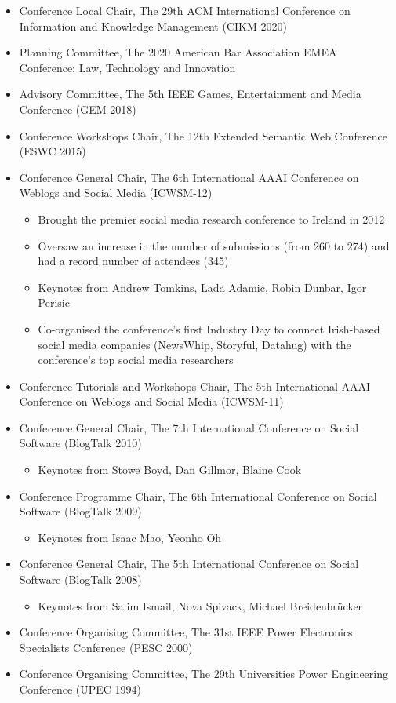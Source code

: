 \documentclass[10pt,a4paper]{res} %
\begin{document}
\begin{resume}
\begin{itemize} \itemsep -2pt
\item Conference Local Chair, The 29th ACM International Conference on Information and Knowledge Management (CIKM 2020)
\item Planning Committee, The 2020 American Bar Association EMEA Conference: Law, Technology and Innovation
\item Advisory Committee, The 5th IEEE Games, Entertainment and Media Conference (GEM 2018)
\item Conference Workshops Chair, The 12th Extended Semantic Web Conference (ESWC 2015)
\item Conference General Chair, The 6th International AAAI Conference on Weblogs and Social Media (ICWSM-12)
\begin{itemize} \itemsep -2pt
\item Brought the premier social media research conference to Ireland in 2012
\item Oversaw an increase in the number of submissions (from 260 to 274) and had a record number of attendees (345)
\item Keynotes from Andrew Tomkins, Lada Adamic, Robin Dunbar, Igor Perisic
\item Co-organised the conference's first Industry Day to connect Irish-based social media companies (NewsWhip, Storyful, Datahug) with the conference's top social media researchers
\end{itemize}
\item Conference Tutorials and Workshops Chair, The 5th International AAAI Conference on Weblogs and Social Media (ICWSM-11)
\item Conference General Chair, The 7th International Conference on Social Software (BlogTalk 2010)
\begin{itemize} \itemsep -2pt
\item Keynotes from Stowe Boyd, Dan Gillmor, Blaine Cook
\end{itemize}
\item Conference Programme Chair, The 6th International Conference on Social Software (BlogTalk 2009)
\begin{itemize} \itemsep -2pt
\item Keynotes from Isaac Mao, Yeonho Oh
\end{itemize}
\item Conference General Chair, The 5th International Conference on Social Software (BlogTalk 2008)
\begin{itemize} \itemsep -2pt
\item Keynotes from Salim Ismail, Nova Spivack, Michael Breidenbr\"{u}cker
\end{itemize}
\item Conference Organising Committee, The 31st IEEE Power Electronics Specialists Conference (PESC 2000)
\item Conference Organising Committee, The 29th Universities Power Engineering Conference (UPEC 1994)
\end{itemize}


\end{resume}
\end{document}
